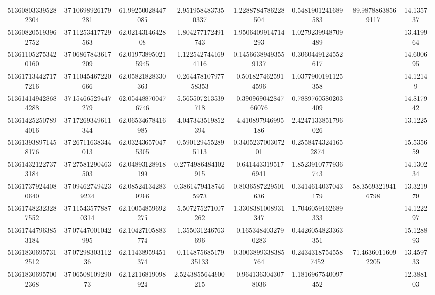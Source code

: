 \documentclass{article}
\begin{document}
\begin{landscape}
\begin{longtable}[c]{S[table-format=18.0]S[table-format=2.15]S[table-format=2.15]S[table-format=-2.17]S[table-format=-2.16]S[table-format=-2.16]S[table-format=-3.16]S[table-format=2.7]}
513608033395282304 & 37.10698926179281  & 61.99250028447085  & -2.9519584837350337   & 1.2288784786228504    & 0.5481901241689583  & -89.98788638569117  & 14.135737  \\
513608205193962752 & 37.11253417729563  & 62.0214314642808   & -1.804277172491743    & 1.9506409914714293    & 1.0279239948709489  & {-}                  & 13.419964  \\
513611052753420160 & 37.06867843617209  & 62.019738950215945 & -1.1225427441694116   & 0.14566389493559137   & 0.3060449124552617  & {-}                  & 14.600695  \\
513617134427177216 & 37.11045467220666  & 62.05821828330363  & -0.26447810797758353  & -0.5018274625914596   & 1.0377900191125358  & {-}                  & 14.12149   \\
513614149428684288 & 37.15466529447279  & 62.054488700476746 & -5.565507213539718    & -0.39096904284766076  & 0.7889760580203409  & {-}                  & 14.817942  \\
513614252507894016 & 37.17269349611344  & 62.06534678416985  & -4.047343519852394    & -4.410897946995186    & 2.4247133851796026  & {-}                  & 13.1225    \\
513613938971458176 & 37.26711638344013  & 62.032436570475305 & -0.5901294552895113   & 0.340523700307201     & 0.25584743241652874 & {-}                  & 15.535659  \\
513614321227373184 & 37.27581290463503  & 62.04893128918199  & 0.2774986484102915    & -0.6414433195176941   & 1.8523910777936743  & {-}                  & 14.130234  \\
513617379244080640 & 37.094627494239234 & 62.085241342839296 & 0.38614794187465973   & 0.8036587229501636    & 0.3414614037043179  & -58.35693219416798  & 13.321979  \\
513617482323287552 & 37.115435778870314 & 62.10054859692275  & -5.507275271007262    & 1.3308381008931347    & 1.7046059162689333  & {-}                  & 14.122297  \\
513617447963853184 & 37.07447001042995  & 62.10427105883774  & -1.355031246763696    & -0.1653484032790283   & 0.4426054823363351  & {-}                  & 15.128893  \\
513618306957312512 & 37.0729830311236   & 62.11438959451374  & -0.11487568517935133  & 0.3003899338385764    & 0.24343187545587452 & -71.46360116092205  & 13.459733  \\
513618306957002368 & 37.0650810929073   & 62.12116819098924  & 2.5243855644900215    & -0.9641363043078036   & 1.1816967540097452  & {-}                  & 12.388103 
 \end{longtable}
 

\end{landscape}
\end{document}
